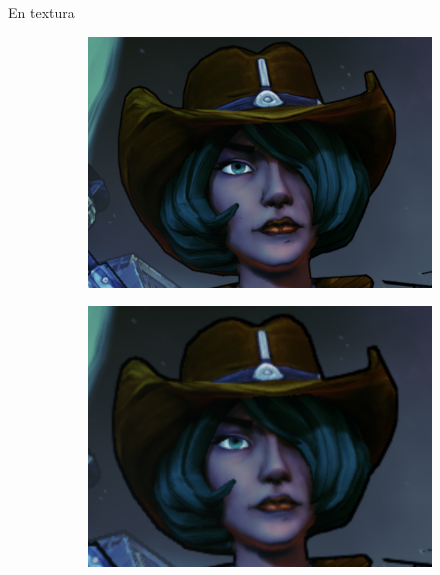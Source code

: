 \documentclass[table]{beamer}
\begin{document}
\begin{frame}[fragile]{En textura}
    \begin{figure}[!htbp]
        \centering
        \begin{subfigure}[b]{0.45\textwidth}
            \includegraphics[width=\textwidth]{figures/ss1on.png}
        \end{subfigure}
        \centering
        \begin{subfigure}[b]{0.45\textwidth}
            \includegraphics[width=\textwidth]{figures/ss1off.png}
        \end{subfigure}
    \end{figure}
\end{frame}
\end{document}
